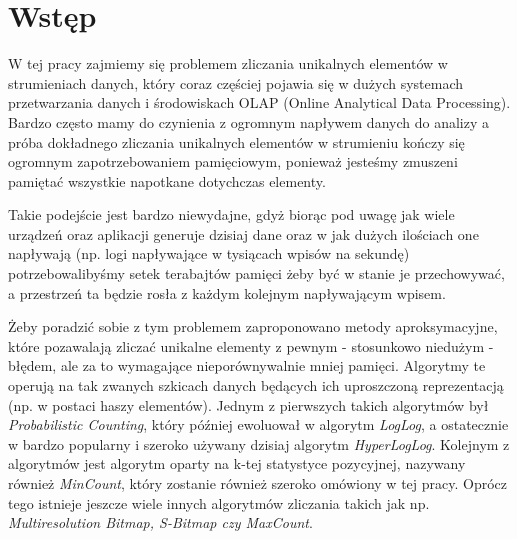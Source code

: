 \chapter{Wstęp}
\thispagestyle{chapterBeginStyle}

W tej pracy zajmiemy się problemem zliczania unikalnych elementów w strumieniach danych, który coraz częściej pojawia się w dużych systemach przetwarzania danych i środowiskach OLAP (Online Analytical Data Processing). Bardzo często mamy do czynienia z ogromnym napływem danych do analizy a próba dokładnego zliczania unikalnych elementów w strumieniu kończy się ogromnym zapotrzebowaniem pamięciowym, ponieważ jesteśmy zmuszeni pamiętać wszystkie napotkane dotychczas elementy.

Takie podejście jest bardzo niewydajne, gdyż biorąc pod uwagę jak wiele urządzeń oraz aplikacji generuje dzisiaj dane oraz w jak dużych ilościach one napływają (np. logi napływające w tysiącach wpisów na sekundę) potrzebowalibyśmy setek terabajtów pamięci żeby być w stanie je przechowywać, a przestrzeń ta będzie rosła z każdym kolejnym napływającym wpisem.

Żeby poradzić sobie z tym problemem zaproponowano metody aproksymacyjne, które pozawalają zliczać unikalne elementy z pewnym - stosunkowo niedużym - błędem, ale za to wymagające nieporównywalnie mniej pamięci. Algorytmy te operują na tak zwanych szkicach danych będących ich uproszczoną reprezentacją (np. w postaci haszy elementów). Jednym z pierwszych takich algorytmów był \textit{Probabilistic Counting}, który później ewoluował w algorytm \textit{LogLog}, a ostatecznie w bardzo popularny i szeroko używany dzisiaj algorytm \textit{HyperLogLog}. Kolejnym z algorytmów jest algorytm oparty na k-tej statystyce pozycyjnej, nazywany również \textit{MinCount}, który zostanie również szeroko omówiony w tej pracy. Oprócz tego istnieje jeszcze wiele innych algorytmów zliczania takich jak np. \textit{Multiresolution Bitmap, S-Bitmap czy MaxCount}.

